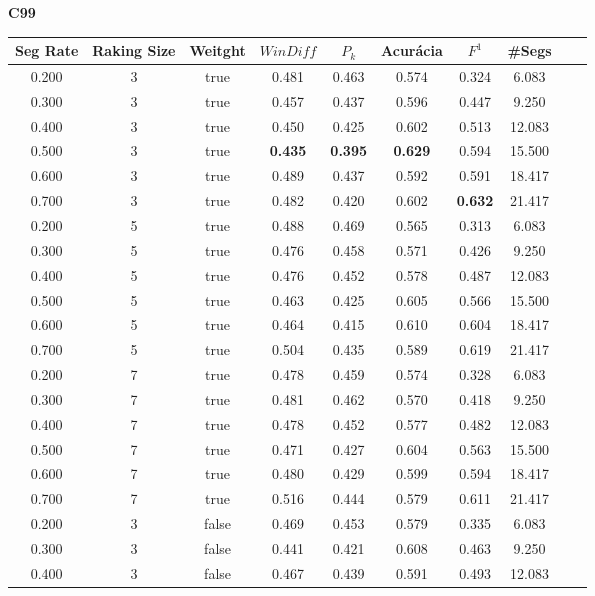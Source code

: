 \center
\textbf{C99}  
\begin{longtable}[c]{|c|c|c|c|c|c|c|c|c|c|} 
\hline 
 Seg Rate & Raking Size & Weitght & $WinDiff$ & $P_k$ & Acurácia & $F^1$ & \#Segs\\ \hline 
 0.200 & 3 & true & 0.481 & 0.463 & 0.574 & 0.324 & 6.083  \\ \hline 
 0.300 & 3 & true & 0.457 & 0.437 & 0.596 & 0.447 & 9.250  \\ \hline 
 0.400 & 3 & true & 0.450 & 0.425 & 0.602 & 0.513 & 12.083  \\ \hline 
 0.500 & 3 & true & \cellcolor{gray!20} \textbf{0.435} & \cellcolor{gray!20} \textbf{0.395} & \cellcolor{gray!20} \textbf{0.629} & 0.594 & 15.500  \\ \hline 
 0.600 & 3 & true & 0.489 & 0.437 & 0.592 & 0.591 & 18.417  \\ \hline 
 0.700 & 3 & true & 0.482 & 0.420 & 0.602 & \cellcolor{gray!20} \textbf{0.632} & 21.417  \\ \hline 
 0.200 & 5 & true & 0.488 & 0.469 & 0.565 & 0.313 & 6.083  \\ \hline 
 0.300 & 5 & true & 0.476 & 0.458 & 0.571 & 0.426 & 9.250  \\ \hline 
 0.400 & 5 & true & 0.476 & 0.452 & 0.578 & 0.487 & 12.083  \\ \hline 
 0.500 & 5 & true & 0.463 & 0.425 & 0.605 & 0.566 & 15.500  \\ \hline 
 0.600 & 5 & true & 0.464 & 0.415 & 0.610 & 0.604 & 18.417  \\ \hline 
 0.700 & 5 & true & 0.504 & 0.435 & 0.589 & 0.619 & 21.417  \\ \hline 
 0.200 & 7 & true & 0.478 & 0.459 & 0.574 & 0.328 & 6.083  \\ \hline 
 0.300 & 7 & true & 0.481 & 0.462 & 0.570 & 0.418 & 9.250  \\ \hline 
 0.400 & 7 & true & 0.478 & 0.452 & 0.577 & 0.482 & 12.083  \\ \hline 
 0.500 & 7 & true & 0.471 & 0.427 & 0.604 & 0.563 & 15.500  \\ \hline 
 0.600 & 7 & true & 0.480 & 0.429 & 0.599 & 0.594 & 18.417  \\ \hline 
 0.700 & 7 & true & 0.516 & 0.444 & 0.579 & 0.611 & 21.417  \\ \hline 
 0.200 & 3 & false & 0.469 & 0.453 & 0.579 & 0.335 & 6.083  \\ \hline 
 0.300 & 3 & false & 0.441 & 0.421 & 0.608 & 0.463 & 9.250  \\ \hline 
 0.400 & 3 & false & 0.467 & 0.439 & 0.591 & 0.493 & 12.083  \\ \hline 

\end{longtable}
